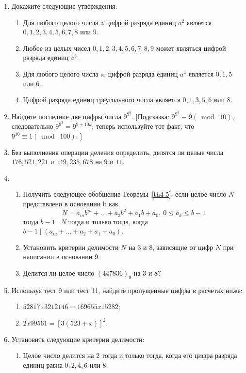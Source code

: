 \documentclass[11pt]{article}
\begin{document}
\begin{enumerate} 
\item Докажите следующие утверждения:
\begin{enumerate} 
\item Для любого целого числа a цифрой разряда единиц $ a^{2} $ является $ 0,1,2,3,4,5,6,7,8 $ или $ 9 $.
\item Любое из целых чисел $ 0,1,2,3,4,5,6,7,8,9 $ может являться цифрой разряда единиц $ a^{3} $.
\item Для любого целого числа a, цифрой разряда единиц $ a^{4} $ является $ 0,1,5 $ или $ 6 $.
\item Цифрой разряда единиц треугольного числа является $ 0,1,3,5,6 $ или $ 8 $.
\end{enumerate}
\item Найдите последние две цифры числа $ 9^{9^{9}} $. [Подсказка: $ 9^{9^{9}}\equiv 9(\bmod\; 10) $, следовательно $ 9^{9^{9}}=9^{9+10k} $; теперь используйте тот факт, что $ 9^{10}\equiv 1(\bmod\; 100). $ ]
\item Без выполнения операции деления определить, делятся ли целые числа $ 176,521,221 $ и $ 149,235,678 $ на $ 9 $ и $ 11 $.
\item 
\begin{enumerate}
	\item Получить следующее обобщение Теоремы~\ref{th4-5}: если целое число $N$ представлено в основании b как \[N=a_{m}b^{m}+\ldots+a_{2}b^{2}+a_{1}b+a_{0},\ 0\leq a_{k}\leq b-1  \] тогда $ b-1\mid N $ тогда и только тогда, когда $ b-1\mid (a_{m}+\ldots+a_{2}+a_{1}+a_{0}) $.
	\item Установить критерии делимости $ N $ на $3$ и $8$, зависящие от цифр $N$ при написании в основании 9.
	\item Делится ли целое число $ (447836)_{9}$ на $3$ и $8$?
\end{enumerate}
\item Используя тест 9 или тест 11, найдите пропущенные цифры в расчетах ниже:
\begin{enumerate}
\item $ 52817\cdot3212146=169655x15282 $;
\item $2x99561=[3(523+x)]^{2}$.	
\end{enumerate}
\item Установить следующие критерии делимости:
\begin{enumerate}
\item Целое число делится на 2 тогда и только тогда, когда его цифра разряда единиц равна $ 0,2,4,6 $ или $8$.

\end{enumerate}
\end{enumerate}
\end{document}
